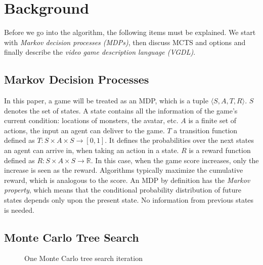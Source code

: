 \section{Background}
\label{sec:background}

Before we go into the algorithm, the following items must be explained. We
start with \emph{Markov decision processes (MDPs)}, then  discuss MCTS and
options and finally describe the \emph{video game description language (VGDL)}.

\subsection{Markov Decision Processes}
\label{subsec:mdps}
In this paper, a game will be treated as an MDP, which is a
tuple $\langle S, A, T, R \rangle$. $S$ denotes the set of states. A state
contains all the information of the game's current condition: locations of
monsters, the avatar, etc. $A$ is a finite set of actions, the input an agent
can deliver to the game. $T$ a transition function defined as $T : S \times A
\times S \rightarrow \left[0,1\right]$. It defines the probabilities over the 
next states an agent can arrive in, when taking an action in a state.
$R$ is a reward function defined as $R: S \times A \times S \rightarrow
\mathbb{R}$. In this case, when the game score increases, only the increase is
seen as the reward. Algorithms typically maximize the cumulative reward, which
is analogous to the score. An MDP by definition has the \emph{Markov property},
which means that the conditional probability distribution of future states
depends only upon the present state. No information from previous states is
needed.


\subsection{Monte Carlo Tree Search}
\begin{figure}
	\centering
	\caption{One Monte Carlo tree search iteration}
	\label{fig:mcts}
\end{figure}

